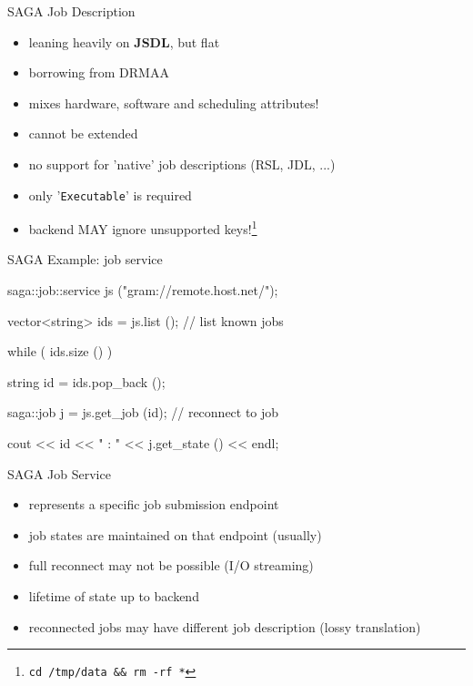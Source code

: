 \documentclass[%
  pdf,
  colorBG,
  slideColor,
  frames,
  ogf
]{prosper}
\newcommand{\T}[1]{\texttt{#1}}
\newcommand{\B}[1]{\textbf{#1}}
\newcommand{\dn}{\vspace*{+1em}}
\begin{document}

 \begin{slide}{SAGA Job Description}

  \dn

  \begin{itemize}

   \item leaning heavily on \B{JSDL}, but flat
   \item borrowing from DRMAA
   \item mixes hardware, software and scheduling attributes!
   \item cannot be extended
   \item no support for 'native' job descriptions (RSL, JDL, ...)
   \item only '\T{Executable}' is required
   \item backend MAY ignore unsupported keys!\footnote{\tiny{\T{cd /tmp/data \&\& rm
   -rf *}}}

  \end{itemize}

 \end{slide}

 
 \begin{slide}{SAGA Example: job service}

  \begin{mycode}[label=job service]

  saga::job::service js ("gram://remote.host.net/");
 
  vector<string> ids = js.list (); // list known jobs
 
  while ( ids.size () )
  {
    string id = ids.pop_back ();

    saga::job j = js.get_job (id);  // reconnect to job
    
    cout << id << " : " << j.get_state () << endl;
  }
  \end{mycode}
   
 \end{slide}
 
 

 \begin{slide}{SAGA Job Service}

  \dn

  \begin{itemize}

   \item represents a specific job submission endpoint
   \item job states are maintained on that endpoint (usually)
   \item full reconnect may not be possible (I/O streaming)
   \item lifetime of state up to backend
   \item reconnected jobs may have different job description (lossy translation)

  \end{itemize}

 \end{slide}
\end{document}
